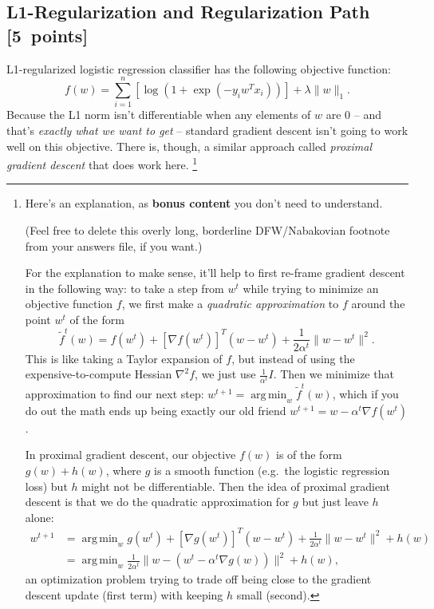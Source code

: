 \documentclass{article}
\newcommand\pts[1]{\textcolor{pointscolour}{[#1~points]}}
\DeclareMathOperator*{\argmin}{arg\,min}
\newcommand{\norm}[1]{\lVert #1 \rVert}
\begin{document}
\subsection{L1-Regularization and Regularization Path \pts{5}}
L1-regularized logistic regression classifier has the following objective function:
\[
f(w) = \sum_{i=1}^n \left[\log(1+\exp(-y_iw^Tx_i))\right] + \lambda\norm{w}_1.
\]
Because the L1 norm isn't differentiable when any elements of $w$ are $0$ -- and that's \emph{exactly what we want to get} -- standard gradient descent isn't going to work well on this objective.
There is, though, a similar approach called \emph{proximal gradient descent} that does work here.%
\footnote{%
    Here's an explanation, as \textbf{bonus content} you don't need to understand.

    (Feel free to delete this overly long, borderline DFW/Nabakovian footnote from your answers file, if you want.)

    For the explanation to make sense, it'll help to first re-frame gradient descent in the following way:
    to take a step from $w^t$ while trying to minimize an objective function $f$,
    we first make a \emph{quadratic approximation} to $f$ around the point $w^t$ of the form
    \[
        \tilde f^t(w) = f(w^t) + [\nabla f(w^t)]^T (w - w^t) + \frac{1}{2 \alpha^t} \norm{w - w^t}^2
    .\]
    This is like taking a Taylor expansion of $f$,
    but instead of using the expensive-to-compute Hessian $\nabla^2 f$,
    we just use $\frac{1}{\alpha^t} I$.
    Then we minimize that approximation to find our next step:
    $w^{t+1} = \argmin_{w} \tilde{f}^t(w)$,
    which if you do out the math ends up being exactly our old friend $w^{t+1} = w - \alpha^t \nabla f(w^t)$.\footnotemark

    In proximal gradient descent, our objective $f(w)$ is of the form $g(w) + h(w)$,
    where $g$ is a smooth function (e.g.\ the logistic regression loss)
    but $h$ might not be differentiable.
    Then the idea of proximal gradient descent is that we do the quadratic approximation for $g$ but just leave $h$ alone:
    \begin{align*}
         w^{t+1}
      &= \argmin_w g(w^t) + [\nabla g(w^t)]^T (w - w^t) + \frac{1}{2 \alpha^t} \norm{w - w^t}^2 + h(w)
    \\&= \argmin_w \frac{1}{2 \alpha^t} \norm{w - (w^t - \alpha^t \nabla g(w))}^2 + h(w)
    \tag{prox} \label{eq:prox}
    ,\end{align*}
    an optimization problem trying to trade off being close to the gradient descent update (first term) with keeping $h$ small (second).

}
\end{document}
